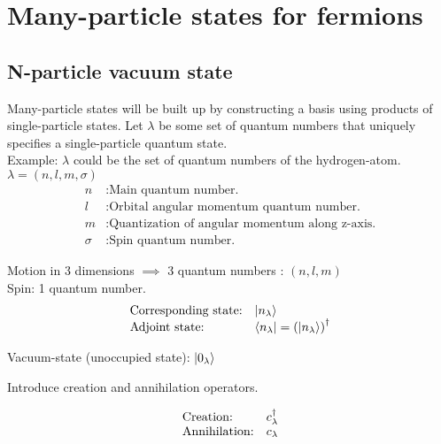 
%

\chapter{Many-particle states for fermions}

\section{N-particle vacuum state}



Many-particle states will be built up by constructing a basis using products of single-particle states. 
Let $\lambda$ be some set of quantum numbers that uniquely specifies a single-particle quantum state.\\

\noindent Example: $\lambda$ could be the set of quantum numbers of the hydrogen-atom.\\
$\lambda = (n,l,m, \sigma)$\\
\begin{align*}
	n &: \text{Main quantum number.}\\
	l &: \text{Orbital angular momentum quantum number.}\\
	m &: \text{Quantization of angular momentum along z-axis.}\\ 
	\sigma &: \text{Spin quantum number.}
\end{align*}

\noindent Motion in 3 dimensions $\implies$ 3 quantum numbers : $(n,l,m)$\\
Spin: 1 quantum number.\\

\[ \begin{array}{ll}
	\mbox{Corresponding state:} & \ket{n_\lambda}\\
	\mbox{Adjoint state:} &  \bra{n_\lambda} = \left(\ket{n_\lambda} \right)^\dagger
\end{array}\] 



\noindent Vacuum-state (unoccupied state): $\ket{0_\lambda}$

\noindent Introduce creation and annihilation operators.

\[ \begin{array}{ll}
	\mbox{Creation:} & c^{\dagger}_\lambda\\
	\mbox{Annihilation:} & c_\lambda
\end{array}\] 

